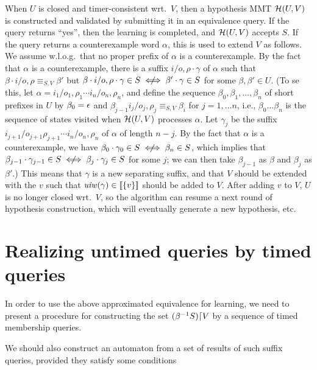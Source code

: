 When $U$ is closed and timer-consistent wrt.\ $V$, then
    a hypothesis MMT $\mathcal{H}(U,V)$ is constructed and
    validated by submitting it in an equivalence query.
    If the query returns ``yes'', then
    the learning is completed, and $\mathcal{H}(U,V)$ accepts $S$.
    If the query returns a counterexample word $\alpha$, this is used to extend
    $V$ as follows. We assume w.l.o.g.\ that no proper prefix of $\alpha$ is
    a counterexample. 
    By the fact that $\alpha$ is a counterexample, there is a suffix
    $i/o,\rho \cdot \gamma$ of $\alpha$
    such that $\beta\cdot i/o,\rho \equiv_{S,V} \beta'$ but
    $\beta \cdot i/o,\rho \cdot \gamma \in S \notiff \beta' \cdot \gamma \in S$
    for some $\beta,\beta' \in U$.
    (To se this, let $\alpha = i_1/o_1,\rho_1 \cdots i_n/o_n,\rho_n$, and
    define the sequence $\beta_0, \beta_1, \ldots ,\beta_{n}$ of short prefixes
    in $U$ by $\beta_0 = \epsilon$ and
    $\beta_{j-1}i_j/o_j,\rho_j \equiv_{S,V} \beta_{i}$ for
    $j = 1, \ldots n$, i.e., $\beta_0 \ldots \beta_n$ is the sequence of states
    visited when $\mathcal{H}(U,V)$ processes $\alpha$.
    Let $\gamma_j$ be the suffix $i_{j+1}/o_{j+1}\rho_{j+1} \cdots i_n/o_n,\rho_n$
    of $\alpha$ of length $n-j$. 
    By the fact that $\alpha$ is a counterexample, we have
    $\beta_0\cdot\gamma_0 \in S \notiff  \beta_{n} \in S$, which implies that
    $\beta_{j-1}\cdot\gamma_{j-1} \in S \notiff \beta_j\cdot\gamma_j \in S$
    for some $j$;
    we can then take $\beta_{j-1}$ as $\beta$ and $\beta_j$ as $\beta'$.)
    This means that $\gamma$ is a new separating suffix, and that $V$ should be
    extended with the $v$ such that
    $\mathit{uiw}(\gamma) \in [\![ \lbrace v\rbrace ] \! ]$
    should be added to
    $V$. After adding $v$ to $V$, $U$ is no longer closed
    wrt.\ $V$, so the algorithm can resume a next round of
    hypothesis construction, which will eventually generate a new hypothesis,
    etc.


\section{Realizing untimed queries by timed queries}

In order to use the above approximated equivalence for learning, we need to
present a procedure for constructing the set
$({\beta}^{-1}{S})\lceil{V}$ by a sequence of timed membership queries.

We should also construct an automaton from a set of results of such
suffix queries, provided they satisfy some conditions

